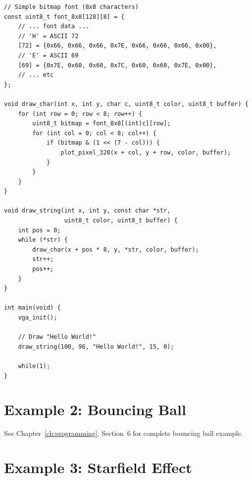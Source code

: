 \documentclass[11pt,letterpaper]{report}
\begin{document}
\begin{lstlisting}[style=c,caption={Simple Text Display (8$\times$8 Font)}]
// Simple bitmap font (8x8 characters)
const uint8_t font_8x8[128][8] = {
    // ... font data ...
    // 'H' = ASCII 72
    [72] = {0x66, 0x66, 0x66, 0x7E, 0x66, 0x66, 0x66, 0x00},
    // 'E' = ASCII 69
    [69] = {0x7E, 0x60, 0x60, 0x7C, 0x60, 0x60, 0x7E, 0x00},
    // ... etc
};

void draw_char(int x, int y, char c, uint8_t color, uint8_t buffer) {
    for (int row = 0; row < 8; row++) {
        uint8_t bitmap = font_8x8[(int)c][row];
        for (int col = 0; col < 8; col++) {
            if (bitmap & (1 << (7 - col))) {
                plot_pixel_320(x + col, y + row, color, buffer);
            }
        }
    }
}

void draw_string(int x, int y, const char *str, 
                 uint8_t color, uint8_t buffer) {
    int pos = 0;
    while (*str) {
        draw_char(x + pos * 8, y, *str, color, buffer);
        str++;
        pos++;
    }
}

int main(void) {
    vga_init();
    
    // Draw "Hello World!"
    draw_string(100, 96, "Hello World!", 15, 0);
    
    while(1);
}
\end{lstlisting}

\section{Example 2: Bouncing Ball}

See Chapter~\ref{ch:programming}, Section~6 for complete bouncing ball example.

\section{Example 3: Starfield Effect}
\end{document}
